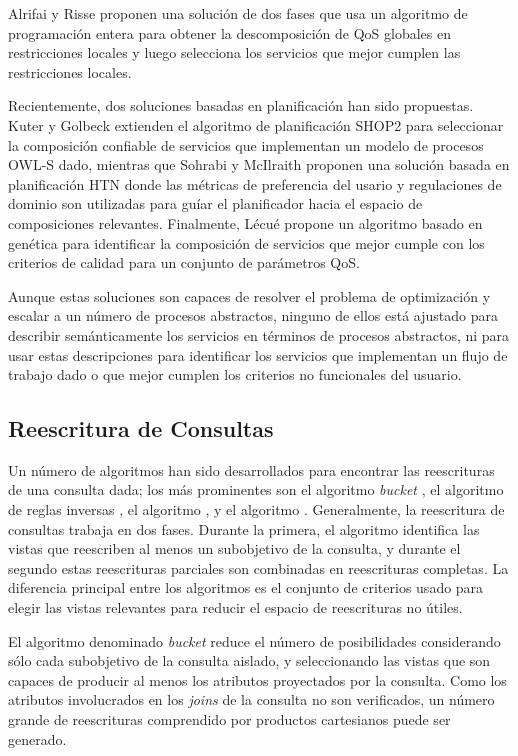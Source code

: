 Alrifai y Risse \cite{alrifaiR09} proponen una solución de dos fases que usa un
algoritmo de programación entera para obtener la descomposición de QoS
globales en restricciones locales y luego selecciona los servicios que mejor
cumplen las restricciones locales.

Recientemente, dos soluciones basadas en planificación han sido propuestas.
Kuter y Golbeck \cite{kuterG09} extienden el algoritmo de planificación SHOP2 para
seleccionar la composición confiable de servicios que implementan un modelo de
procesos OWL-S dado, mientras que Sohrabi y McIlraith \cite{sohrabiM09} proponen una
solución basada en planificación HTN donde las métricas de preferencia del
usario y regulaciones de dominio son utilizadas para guíar el planificador hacia
el espacio de composiciones relevantes. Finalmente, Lécué \cite{lecue09} propone un
algoritmo basado en genética para identificar la composición de servicios que
mejor cumple con los criterios de calidad para un conjunto de parámetros QoS.

Aunque estas soluciones son capaces de resolver el problema de optimización y
escalar a un número de procesos abstractos, ninguno de ellos está ajustado para
describir semánticamente los servicios en términos de procesos abstractos, ni
para usar estas descripciones para identificar los servicios que implementan un
flujo de trabajo dado o que mejor cumplen los criterios no funcionales del
usuario.

\subsection{Reescritura de Consultas}

Un número de algoritmos han sido desarrollados para encontrar las reescrituras
de una consulta dada; los más prominentes son el algoritmo \emph{bucket} \cite{levy:bucket}, el
algoritmo de reglas inversas \cite{pods:DuschkaG97,Qian96}, el algoritmo
\minicon \cite{pottinger:minicon}, y el
algoritmo \mcdsat \cite{arvelo:aaai06}. Generalmente, la reescritura de consultas trabaja en
dos fases. Durante la primera, el algoritmo identifica las vistas que reescriben
al menos un subobjetivo de la consulta, y durante el segundo estas reescrituras
parciales son combinadas en reescrituras completas. La diferencia principal
entre los algoritmos es el conjunto de criterios usado para elegir las vistas
relevantes para reducir el espacio de reescrituras no útiles.

El algoritmo denominado \emph{bucket} reduce el número de posibilidades considerando sólo cada
subobjetivo de la consulta aislado, y seleccionando las vistas que son capaces
de producir al menos los atributos proyectados por la consulta. Como los
atributos involucrados en los \emph{joins} de la consulta no son verificados, un número
grande de reescrituras comprendido por productos cartesianos puede ser generado.

